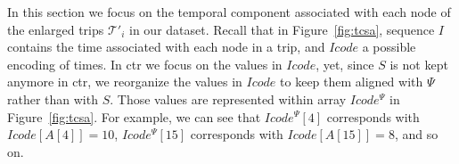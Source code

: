 



	In this section we focus on the temporal component associated with each node of the enlarged trips $\mathcal{T}'_i$ 
	in our dataset. Recall that in Figure~\ref{fig:tcsa}, sequence $I$ contains the time
	associated with each node in a trip, and $Icode$ a possible encoding of times. 
	In \gls{ctr} we focus on the values in $Icode$, yet, since $S$ is not kept anymore in \gls{ctr}, we 
	reorganize the values in $Icode$ to keep them aligned with $\Psi$ rather than with $S$. Those
	values are represented within array $Icode^{\Psi}$ in Figure~\ref{fig:tcsa}. 
	For example, we can see that $Icode^{\Psi}[4]$ corresponds with $Icode[A[4]]=10$, 
	$Icode^{\Psi}[15]$ corresponds with $Icode[A[15]]=8$, and so on.

